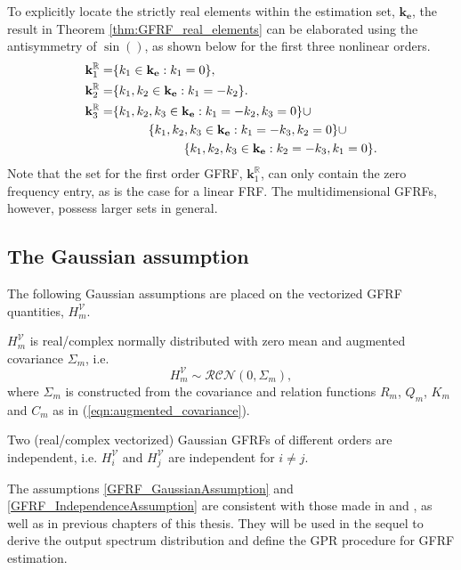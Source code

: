 To explicitly locate the strictly real elements within the estimation set, $\mathbf{k_e}$, the result in Theorem \ref{thm:GFRF_real_elements} can be elaborated using the antisymmetry of $\sin()$, as shown below for the first three nonlinear orders. %
\begin{align}
\mathbf{k}_1^{\mathbb{R}} = &\{k_1 \in \mathbf{k_e}: k_1 = 0 \}, \\
\mathbf{k}_2^{\mathbb{R}} = &\{k_1, k_2 \in \mathbf{k_e}: k_1 = -k_2 \}. \\
\mathbf{k}_3^{\mathbb{R}} = &\{k_1,k_2,k_3 \in \mathbf{k_e}: k_1 = -k_2, k_3 = 0 \} \cup \nonumber \\
& \hspace{10mm} \{k_1,k_2,k_3  \in \mathbf{k_e}: k_1 = -k_3, k_2 = 0 \} \cup \nonumber \\
& \hspace{20mm} \{k_1,k_2,k_3  \in \mathbf{k_e}: k_2 = -k_3, k_1 = 0 \}. 
\end{align}
Note that the set for the first order GFRF, $\mathbf{k}_1^{\mathbb{R}}$, can only contain the zero frequency entry, as is the case for a linear FRF. The multidimensional GFRFs, however, possess larger sets in general.

\subsection{The Gaussian assumption}

The following Gaussian assumptions are placed on the vectorized GFRF quantities, $H_m^{\mathcal{V}}$.  
\begin{assum}
\label{GFRF_GaussianAssumption}
$H_m^{\mathcal{V}}$ is real/complex normally distributed with zero mean and augmented covariance $\Sigma_m$, i.e.
\begin{equation} 
\label{GFRF_GaussianDefn}
H_m^{\mathcal{V}} \sim \mathcal{RCN}(0,\Sigma_m) ,
\end{equation}
where $\Sigma_m$ is constructed from the covariance and relation functions $R_m$, $Q_m$, $K_m$ and $C_m$ as in (\ref{eqn:augmented_covariance}).
\end{assum}
\begin{assum}
\label{GFRF_IndependenceAssumption}
Two (real/complex vectorized) Gaussian GFRFs of different orders are independent, i.e. $H_i^{\mathcal{V}}$ and $H_j^{\mathcal{V}}$ are independent for $i \neq j$.
\end{assum}
The assumptions \ref{GFRF_GaussianAssumption} and \ref{GFRF_IndependenceAssumption} are consistent with those made in \cite{Birpoutsoukis2017} and \cite{Lataire2016}, as well as in previous chapters of this thesis. They will be used in the sequel to derive the output spectrum distribution and define the GPR procedure for GFRF estimation.

